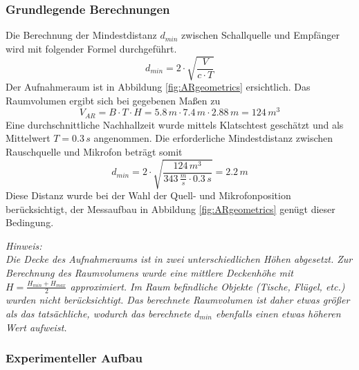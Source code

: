 \documentclass[11pt]{report}
\begin{document}
\subsubsection{Grundlegende Berechnungen}
Die Berechnung der Mindestdistanz $d_{min}$ zwischen Schallquelle und Empf\"anger wird mit folgender Formel durchgef\"uhrt.
\begin{equation}
d_{min}=2\cdot \sqrt{\frac{V}{c\cdot T}}
\end{equation}
Der Aufnahmeraum ist in Abbildung \ref{fig:ARgeometrics} ersichtlich. Das Raumvolumen ergibt sich bei gegebenen Ma\ss en zu 
\begin{equation}
V_{AR} = B\cdot T\cdot H = 5.8\,m\cdot 7.4\,m\cdot 2.88\,m = 124\,m^{3}
\end{equation}
Eine durchschnittliche Nachhallzeit wurde mittels Klatschtest gesch\"atzt und als Mittelwert $T=0.3\,s$ angenommen. Die erforderliche Mindestdistanz zwischen Rauschquelle und Mikrofon betr\"agt somit
\begin{equation}
d_{min}=2\cdot \sqrt{\frac{124\,m^{3}}{343\,\frac{m}{s}\cdot 0.3\,s}} = 2.2\,m
\end{equation}
Diese Distanz wurde bei der Wahl der Quell- und Mikrofonposition ber\"ucksichtigt, der Messaufbau in Abbildung \ref{fig:ARgeometrics} gen\"ugt dieser Bedingung.
\begin{leftbar}
\textit{ Hinweis:\\
Die Decke des Aufnahmeraums ist in zwei unterschiedlichen H\"ohen abgesetzt. Zur Berechnung des Raumvolumens wurde eine mittlere Deckenh\"ohe mit $H=\frac{H_{min}+H_{max}}{2}$ approximiert. Im Raum befindliche Objekte (Tische, Fl\"ugel, etc.) wurden nicht ber\"ucksichtigt. Das berechnete Raumvolumen ist daher etwas gr\"o\ss er als das tats\"achliche, wodurch das berechnete $d_{min}$ ebenfalls einen etwas h\"oheren Wert aufweist.} 
\end{leftbar}
\subsubsection{Experimenteller Aufbau}
\end{document}
